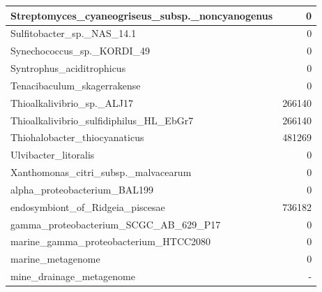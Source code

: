 \documentclass[12pt,a4paper]{article}
\begin{document}
\begin{table}[ht]
\begin{center}
\begin{tabular}{|l*{1}{|r}|}
Streptomyces\_cyaneogriseus\_subsp.\_noncyanogenus & 0 \\ \hline
Sulfitobacter\_sp.\_NAS\_14.1 & 0 \\ \hline
Synechococcus\_sp.\_KORDI\_49 & 0 \\ \hline
Syntrophus\_aciditrophicus & 0 \\ \hline
Tenacibaculum\_skagerrakense & 0 \\ \hline
Thioalkalivibrio\_sp.\_ALJ17 & 266140 \\ \hline
Thioalkalivibrio\_sulfidiphilus\_HL\_EbGr7 & 266140 \\ \hline
Thiohalobacter\_thiocyanaticus & 481269 \\ \hline
Ulvibacter\_litoralis & 0 \\ \hline
Xanthomonas\_citri\_subsp.\_malvacearum & 0 \\ \hline
alpha\_proteobacterium\_BAL199 & 0 \\ \hline
endosymbiont\_of\_Ridgeia\_piscesae & 736182 \\ \hline
gamma\_proteobacterium\_SCGC\_AB\_629\_P17 & 0 \\ \hline
marine\_gamma\_proteobacterium\_HTCC2080 & 0 \\ \hline
marine\_metagenome & 0 \\ \hline
mine\_drainage\_metagenome & - \\ \hline
\end{tabular}
\end{center}
\end{table}
\end{document}
